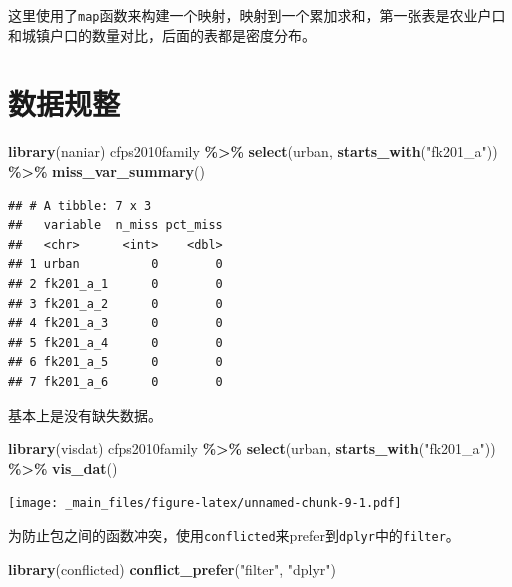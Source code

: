 \documentclass[
]{book}
\newenvironment{Shaded}{\begin{snugshade}}{\end{snugshade}}
\newcommand{\FunctionTok}[1]{\textcolor[rgb]{0.13,0.29,0.53}{\textbf{#1}}}
\newcommand{\NormalTok}[1]{#1}
\newcommand{\SpecialCharTok}[1]{\textcolor[rgb]{0.81,0.36,0.00}{\textbf{#1}}}
\newcommand{\StringTok}[1]{\textcolor[rgb]{0.31,0.60,0.02}{#1}}
\begin{document}
这里使用了\texttt{map}函数来构建一个映射，映射到一个累加求和，第一张表是农业户口和城镇户口的数量对比，后面的表都是密度分布。

\hypertarget{ux6570ux636eux89c4ux6574}{%
\section{数据规整}\label{ux6570ux636eux89c4ux6574}}

\begin{Shaded}
\begin{Highlighting}[]
\FunctionTok{library}\NormalTok{(naniar)}
\NormalTok{cfps2010family }\SpecialCharTok{\%\textgreater{}\%}
  \FunctionTok{select}\NormalTok{(urban, }\FunctionTok{starts\_with}\NormalTok{(}\StringTok{"fk201\_a"}\NormalTok{)) }\SpecialCharTok{\%\textgreater{}\%}
  \FunctionTok{miss\_var\_summary}\NormalTok{()}
\end{Highlighting}
\end{Shaded}

\begin{verbatim}
## # A tibble: 7 x 3
##   variable  n_miss pct_miss
##   <chr>      <int>    <dbl>
## 1 urban          0        0
## 2 fk201_a_1      0        0
## 3 fk201_a_2      0        0
## 4 fk201_a_3      0        0
## 5 fk201_a_4      0        0
## 6 fk201_a_5      0        0
## 7 fk201_a_6      0        0
\end{verbatim}

基本上是没有缺失数据。

\begin{Shaded}
\begin{Highlighting}[]
\FunctionTok{library}\NormalTok{(visdat)}
\NormalTok{cfps2010family }\SpecialCharTok{\%\textgreater{}\%}
  \FunctionTok{select}\NormalTok{(urban, }\FunctionTok{starts\_with}\NormalTok{(}\StringTok{"fk201\_a"}\NormalTok{)) }\SpecialCharTok{\%\textgreater{}\%}
  \FunctionTok{vis\_dat}\NormalTok{()}
\end{Highlighting}
\end{Shaded}

\texttt{[image: \_main\_files/figure-latex/unnamed-chunk-9-1.pdf]}

为防止包之间的函数冲突，使用\texttt{conflicted}来prefer到\texttt{dplyr}中的\texttt{filter}。

\begin{Shaded}
\begin{Highlighting}[]
\FunctionTok{library}\NormalTok{(conflicted)}
\FunctionTok{conflict\_prefer}\NormalTok{(}\StringTok{"filter"}\NormalTok{, }\StringTok{"dplyr"}\NormalTok{)}
\end{Highlighting}
\end{Shaded}
\end{document}
